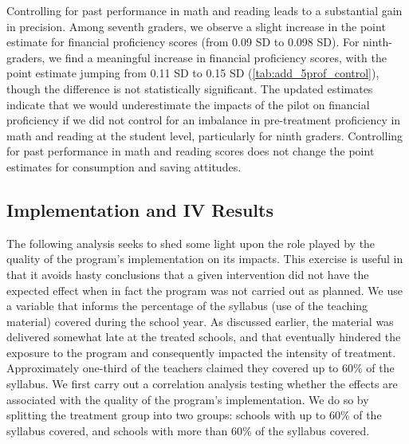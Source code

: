 
Controlling for past performance in math and reading leads to a substantial gain in precision. Among seventh graders, we observe a slight increase in the point estimate for financial proficiency scores (from 0.09 SD to 0.098 SD). For ninth-graders, we find a meaningful increase in financial proficiency scores, with the point estimate jumping from 0.11 SD to 0.15 SD (\autoref{tab:add_5prof_control}), though the difference is not statistically significant. The updated estimates indicate that we would underestimate the impacts of the pilot on financial proficiency if we did not control for an imbalance in pre-treatment proficiency in math and reading at the student level, particularly for ninth graders.  Controlling for past performance in math and reading scores does not change the point estimates for consumption and saving attitudes. 


\subsection{Implementation and IV Results}

The following analysis seeks to shed some light upon the role played by the quality of the program's implementation on its impacts. This exercise is useful in that it avoids hasty conclusions that a given intervention did not have the expected effect when in fact the program was not carried out as planned. 
We use a variable that informs the percentage of the syllabus (use of the teaching material) covered during the school year. As discussed earlier, the material was delivered somewhat late at the treated schools, and that eventually hindered the exposure to the program and consequently impacted the intensity of treatment. Approximately one-third of the teachers claimed they covered up to 60\% of the syllabus. 
We first carry out a correlation analysis testing whether the effects are associated with the quality of the program's implementation. We do so by splitting the treatment group into two groups: schools with up to 60\% of the syllabus covered, and schools with more than 60\% of the syllabus covered.

